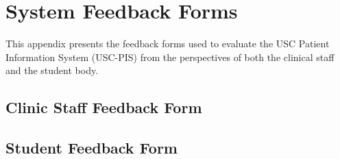 
\chapter{System Feedback Forms}
\label{appendix:system_feedback_forms}

This appendix presents the feedback forms used to evaluate the USC Patient Information System (USC-PIS) from the perspectives of both the clinical staff and the student body.

\section{Clinic Staff Feedback Form}


\section{Student Feedback Form}

